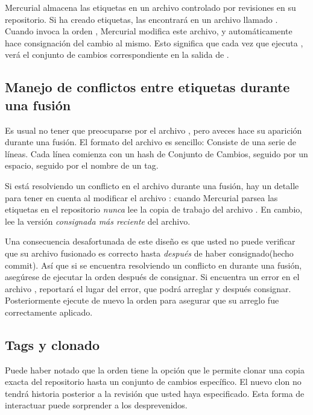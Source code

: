 Mercurial almacena las etiquetas en un archivo controlado por revisiones en
su repositorio. Si ha creado etiquetas, las encontrará en un archivo
llamado .  Cuando invoca la orden ,
Mercurial modifica este archivo, y automáticamente hace consignación del
cambio al mismo.  Esto significa que cada vez que ejecuta ,
verá el conjunto de cambios correspondiente en la salida de .

\subsection{Manejo de conflictos entre etiquetas durante una fusión}

Es usual no tener que preocuparse por el archivo ,
pero aveces hace su aparición durante una fusión. El formato del
archivo es sencillo: Consiste de una serie de líneas. Cada línea
comienza con un hash de Conjunto de Cambios, seguido por un espacio,
seguido por el nombre de un tag.

Si está resolviendo un conflicto en el archivo 
durante una fusión, hay un detalle para tener en cuenta al modificar
el archivo :
cuando Mercurial parsea las etiquetas en el repositorio \emph{nunca}
lee la copia de trabajo del archivo .  En cambio,
lee la versión \emph{consignada más reciente} del archivo.

Una consecuencia desafortunada de este diseño es que usted no puede
verificar que su archivo  fusionado es correcto hasta
\emph{después} de haber consignado(hecho commit). Así que si se
encuentra resolviendo un conflicto en  durante una
fusión, asegúrese de ejecutar la orden  después de
consignar. Si encuentra un error en el archivo , 
reportará el lugar del error, que podrá arreglar y después
consignar. Posteriormente ejecute de nuevo la orden  para
asegurar que su arreglo fue correctamente aplicado.

\subsection{Tags y clonado}

Puede haber notado que la orden  tiene la opción
 que le permite clonar una copia exacta del
repositorio hasta un conjunto de cambios específico. El nuevo clon no
tendrá historia posterior a la revisión que usted haya
especificado. Esta forma de interactuar puede sorprender a los
desprevenidos.

